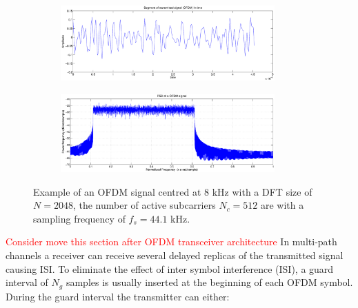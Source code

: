 \documentclass[12pt,a4paper,openright]{report}
\begin{document}
\begin{figure}[H]
 \centering
	\begin{subfigure}[H]{0.9\textwidth}
 	\centering
    \includegraphics[width=0.9\textwidth]{ofdmsignal.eps}

	\end{subfigure}
	
	\begin{subfigure}[H]{0.9\textwidth}
 	\centering
    \includegraphics[width=0.9\textwidth]{psdofdm.eps}
 	\end{subfigure}
    \caption[OFDM signal segment and the PSD of a OFDM signal]{Example of an OFDM signal centred at 8 kHz with a DFT size of $N=2048$, the number of active subcarriers $N_c =512$ are with a sampling frequency of $f_s=44.1$ kHz.}
    \label{fig:ofdmsig}
\end{figure}


\textcolor{red}{Consider move this section after OFDM transceiver architecture}
In multi-path channels a receiver can receive several delayed replicas of the transmitted signal causing ISI. To eliminate the effect of inter symbol interference (ISI), a guard interval of $N_g$ samples is usually inserted at the beginning of each OFDM symbol. During the guard interval the transmitter can either:
\end{document}

